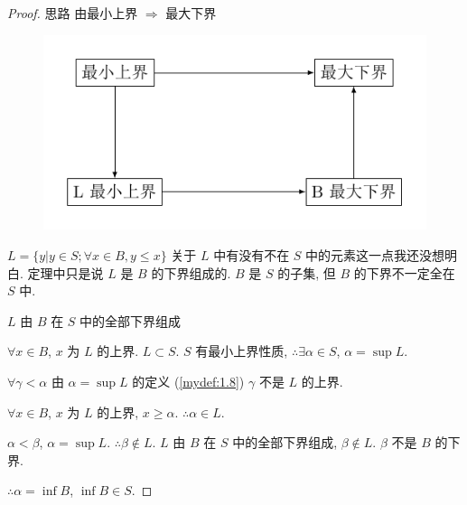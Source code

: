 \begin{proof}
    思路 由最小上界 $\Rightarrow $ 最大下界
    \begin{figure}[htbp]
        \centering
        \includegraphics[width=0.7\linewidth]{pic/chap01sec02_proof11.pdf}
        \label{fig:chap01sec02_proof11}
    \end{figure}

    $L = \{y| y\in S; \forall x\in B, y\leq x\}$
    关于 $L$ 中有没有不在 $S$ 中的元素这一点我还没想明白.
    定理中只是说 $L$ 是 $B$ 的下界组成的. 
    $B$ 是 $S$ 的子集, 但 $B$ 的下界不一定全在 $S$ 中. 

    $L$ 由 $B$ 在 $S$ 中的全部下界组成

    $\forall x\in B$, $x$ 为 $L$ 的上界. $L\subset S$.
    $S$ 有最小上界性质,
    $\therefore \exists \alpha\in S$, $\alpha = \sup L$.

    $\forall \gamma <\alpha$ 由 $\alpha = \sup L$ 的定义 (\ref{mydef:1.8})
    $\gamma$ 不是 $L$ 的上界.

    $\forall x \in B$, $x$ 为 $L$ 的上界, $x \geq \alpha$. $\therefore \alpha \in L$.

    $\alpha < \beta$, $\alpha = \sup L$. $\therefore \beta \not\in L$.
    $L$ 由 $B$ 在 $S$ 中的全部下界组成, $\beta \not\in L$.
    $\beta$ 不是 $B$ 的下界.

    $\therefore \alpha = \inf B$, $\inf B\in S$.
\end{proof}

